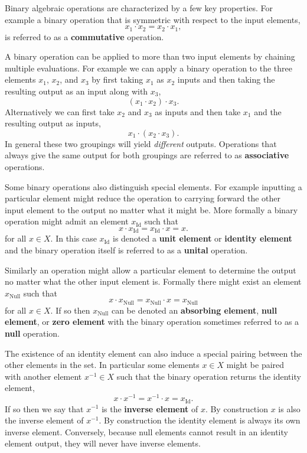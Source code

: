 \documentclass[
  letterpaper,
  DIV=11,
  numbers=noendperiod]{scrartcl}
\begin{document}
Binary algebraic operations are characterized by a few key properties.
For example a binary operation that is symmetric with respect to the
input elements, \[
x_{1} \cdot x_{2} = x_{2} \cdot x_{1},
\] is referred to as a \textbf{commutative} operation.

A binary operation can be applied to more than two input elements by
chaining multiple evaluations. For example we can apply a binary
operation to the three elements \(x_{1}\), \(x_{2}\), and \(x_{3}\) by
first taking \(x_{1}\) as \(x_{2}\) inputs and then taking the resulting
output as an input along with \(x_{3}\), \[
(x_{1} \cdot x_{2}) \cdot x_{3}.
\] Alternatively we can first take \(x_{2}\) and \(x_{3}\) as inputs and
then take \(x_{1}\) and the resulting output as inputs, \[
x_{1} \cdot (x_{2} \cdot x_{3}).
\] In general these two groupings will yield \emph{different} outputs.
Operations that always give the same output for both groupings are
referred to as \textbf{associative} operations.

Some binary operations also distinguish special elements. For example
inputting a particular element might reduce the operation to carrying
forward the other input element to the output no matter what it might
be. More formally a binary operation might admit an element
\(x_{\text{Id}}\) such that \[
x \cdot x_{\text{Id}} = x_{\text{Id}} \cdot x = x.
\] for all \(x \in X\). In this case \(x_{\text{Id}}\) is denoted a
\textbf{unit element} or \textbf{identity element} and the binary
operation itself is referred to as a \textbf{unital} operation.

Similarly an operation might allow a particular element to determine the
output no matter what the other input element is. Formally there might
exist an element \(x_{\text{Null}}\) such that \[
x \cdot x_{\text{Null}} = x_{\text{Null}} \cdot x = x_{\text{Null}}
\] for all \(x \in X\). If so then \(x_{\text{Null}}\) can be denoted an
\textbf{absorbing element}, \textbf{null element}, or \textbf{zero
element} with the binary operation sometimes referred to as a
\textbf{null} operation.

The existence of an identity element can also induce a special pairing
between the other elements in the set. In particular some elements
\(x \in X\) might be paired with another element \(x^{-1} \in X\) such
that the binary operation returns the identity element, \[
x \cdot x^{-1} = x^{-1} \cdot x = x_{\text{Id}}.
\] If so then we say that \(x^{-1}\) is the \textbf{inverse element} of
\(x\). By construction \(x\) is also the inverse element of \(x^{-1}\).
By construction the identity element is always its own inverse element.
Conversely, because null elements cannot result in an identity element
output, they will never have inverse elements.
\end{document}
